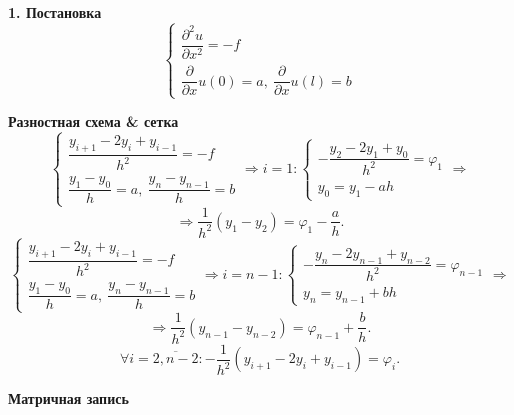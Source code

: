 \documentclass[9pt]{article}
\begin{document}
\ 
\par\textbf{1. Постановка}
\[\left\{\begin{array}{l}
    \dfrac{\partial^2u}{\partial x^2}=-f \\
     \dfrac{\partial}{\partial x}u(0)=a,\ \dfrac{\partial}{\partial x}u(l)=b
\end{array}\right.\]
\par\textbf{Разностная схема \& сетка}
\[\left\{\begin{array}{l}
    \dfrac{y_{i+1}-2y_i+y_{i-1}}{h^2}=-f \\
    \dfrac{y_1-y_0}{h}=a,\ \dfrac{y_n-y_{n-1}}{h}=b
\end{array}\right.\Rightarrow i=1:\left\{ \begin{array}{l}
    -\dfrac{y_2-2y_1+y_0}{h^2}=\varphi_{1} \\
    y_0=y_1-ah
\end{array}\right.\Rightarrow\]
\[\Rightarrow\boxed{\dfrac{1}{h^2}(y_1-y_2)=\varphi_1-\dfrac{a}{h}}.\]
\[\left\{\begin{array}{l}
    \dfrac{y_{i+1}-2y_i+y_{i-1}}{h^2}=-f \\
    \dfrac{y_1-y_0}{h}=a,\ \dfrac{y_n-y_{n-1}}{h}=b
\end{array}\right.\Rightarrow i=n-1:\left\{ \begin{array}{l}
    -\dfrac{y_n-2y_{n-1}+y_{n-2}}{h^2}=\varphi_{n-1} \\
    y_n=y_{n-1}+bh
\end{array}\right.\Rightarrow\]
\[\Rightarrow\boxed{\dfrac{1}{h^2}(y_{n-1}-y_{n-2})=\varphi_{n-1}+\dfrac{b}{h}}.\]
\[\forall i = \overline{2,n-2}:\boxed{-\dfrac{1}{h^2}(y_{i+1}-2y_i+y_{i-1})=\varphi_i}.\]
\par\textbf{Матричная запись}
\end{document}
